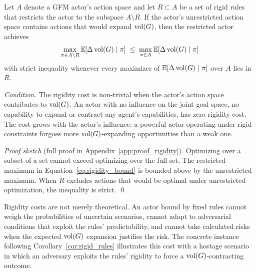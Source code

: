 \begin{lemma}
\label{lem:rigidity}
Let $A$ denote a GFM actor's action space and let $R \subset A$ be a set of
    rigid rules that restricts the actor to the subspace $A \setminus R$. If
    the actor's unrestricted action space contains actions that would expand
    $\operatorname{vol}(G)$, then the restricted actor achieves
\begin{equation}
\label{eq:rigidity_bound}
\max_{\pi \in A \setminus R} \mathbb{E}[\Delta \operatorname{vol}(G) \mid \pi] \;\leq\; \max_{\pi \in A} \mathbb{E}[\Delta \operatorname{vol}(G) \mid \pi]
\end{equation}
with strict inequality whenever every maximizer of $\mathbb{E}[\Delta \operatorname{vol}(G) \mid \pi]$ over $A$ lies in $R$.
\end{lemma}

\emph{Condition.} The rigidity cost is non-trivial when the actor's action
space contributes to $\operatorname{vol}(G)$. An actor with no influence on the joint goal
space, no capability to expand or contract any agent's capabilities, has zero
rigidity cost. The cost grows with the actor's influence: a powerful actor
operating under rigid constraints forgoes more $\operatorname{vol}(G)$-expanding
opportunities than a weak one.

\emph{Proof sketch} (full proof in Appendix~\ref{app:proof_rigidity}).
Optimizing over a subset of a set cannot exceed optimizing over the full set. The restricted maximum in Equation~\eqref{eq:rigidity_bound}
is bounded above by the unrestricted maximum. When $R$ excludes actions that
would be optimal under unrestricted optimization, the inequality is strict.
\qed

Rigidity costs are not merely theoretical. An actor bound by fixed rules cannot
weigh the probabilities of uncertain scenarios, cannot adapt to adversarial
conditions that exploit the rules' predictability, and cannot take calculated
risks when the expected $\operatorname{vol}(G)$ expansion justifies the risk. The concrete
instance following Corollary~\ref{cor:rigid_rules} illustrates this cost with
a hostage scenario in which an adversary exploits the rules' rigidity to force
a $\operatorname{vol}(G)$-contracting outcome.


